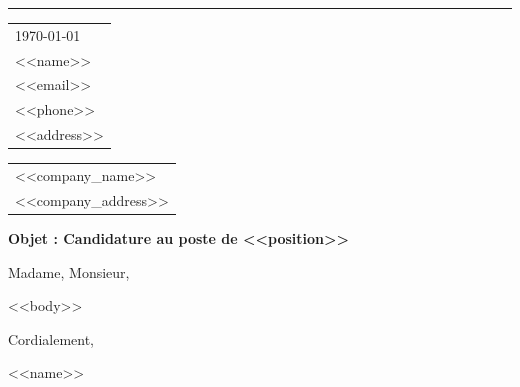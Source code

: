 \documentclass[11pt]{article}
\begin{document}
\rule{\linewidth}{0.8pt}

\bigskip

\hfill
\begin{tabular}{l@{}}
  \hfill \today \bigskip\\
  \hfill <<name>> \\
  \hfill <<email>> \\
  \hfill <<phone>> \\
  \hfill <<address>>
\end{tabular}

\bigskip

\begin{tabular}{@{}l}
  <<company_name>> \\
  <<company_address>>
\end{tabular}

\bigskip

\textbf{Objet : Candidature au poste de <<position>>}

\bigskip

Madame, Monsieur,

<<body>>

\bigskip

Cordialement,

\vspace{20pt}

<<name>>
\end{document}
